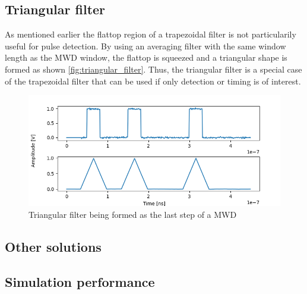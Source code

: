 \subsection{Triangular filter}

As mentioned earlier the flattop region of a trapezoidal filter
is not particularily useful for pulse detection. By using an 
averaging filter with the same window length as the MWD window, 
the flattop is squeezed and a triangular shape is formed
as shown \autoref{fig:triangular_filter}.
Thus, the triangular filter is a special case of the 
trapezoidal filter that can be used if only detection or timing is of interest.

\begin{figure}[H]
  \centering
  \includegraphics[width=\linewidth]{media/triangular_filter.png}
  \caption{Triangular filter being formed as the last step of a MWD}
  \label{fig:triangular_filter} 
\end{figure}

\subsection{Other solutions}
\subsection{Simulation performance}
